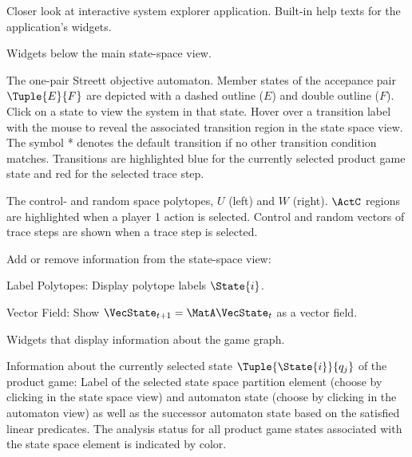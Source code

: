 Closer look at interactive system explorer application.
Built-in help texts for the application's widgets.


\startsubject[title=View Widgets]

    Widgets below the main state-space view.

    \startsubsubject[title={Widget: Objective Automaton}]

        The one-pair Streett objective automaton.
        Member states of the accepance pair $\Tuple{E}{F}$ are depicted with a dashed outline ($E$) and double outline ($F$).
        Click on a state to view the system in that state.
        Hover over a transition label with the mouse to reveal the associated transition region in the state space view.
        The symbol * denotes the default transition if no other transition condition matches.
        Transitions are highlighted blue for the currently selected product game state and red for the selected trace step.

    \stopsubsubject

    \startsubsubject[title={Widget: Control and Random Space}]

        The control- and random space polytopes, $U$ (left) and $W$ (right).
        $\ActC$ regions are highlighted when a player 1 action is selected.
        Control and random vectors of trace steps are shown when a trace step is selected.

    \stopsubsubject

    \startsubsubject[title={Widget: View Settings}]

        Add or remove information from the state-space view:

        \startitemize[packed]
            \item{Label Polytopes: Display polytope labels $\State{i}$.}
            \item{Vector Field: Show $\VecState_{t+1} = \MatA \VecState_{t}$ as a vector field.}
        \stopitemize

    \stopsubsubject

\stopsubject


\startsubject[title={State Widgets}]

    Widgets that display information about the game graph.

    \startsubsubject[title={Widget: Selection}]
        Information about the currently selected state $\Tuple{\State{i}}{q_j}$ of the product game:
        Label of the selected state space partition element (choose by clicking in the state space view) and automaton state (choose by clicking in the automaton view) as well as the successor automaton state based on the satisfied linear predicates.
        The analysis status for all product game states associated with the state space element is indicated by color.

